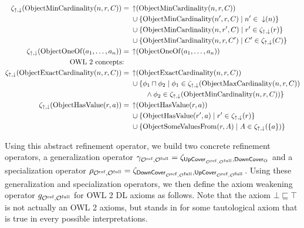 {\begin{align*}
    \zeta_{\mathop{\uparrow}, \mathop{\downarrow}}(\mathrm{ObjectMinCardinality}(n, r, C)) ={} & \mathop{\uparrow} (\mathrm{ObjectMinCardinality}(n, r, C)) \\& \cup \{\mathrm{ObjectMinCardinality}(n', r, C) \mid n' \in \; \mathop{\downarrow} (n)\} \\& \cup \{\mathrm{ObjectMinCardinality}(n, r', C) \mid r' \in \zeta_{\mathop{\uparrow}, \mathop{\downarrow}}(r)\} \\& \cup \{\mathrm{ObjectMinCardinality}(n, r, C') \mid C' \in \zeta_{\mathop{\uparrow}, \mathop{\downarrow}} (C)\} \\
    \zeta_{\mathop{\uparrow}, \mathop{\downarrow}}(\mathrm{ObjectOneOf}(a_1, \dots, a_n)) ={} & \mathop{\uparrow} (\mathrm{ObjectOneOf}(a_1, \dots, a_n)) \\
    \text{OWL 2 concepts:} \quad & \\
    \zeta_{\mathop{\uparrow}, \mathop{\downarrow}}(\mathrm{ObjectExactCardinality}(n, r, C)) ={} & \mathop{\uparrow} (\mathrm{ObjectExactCardinality}(n, r, C)) \\& \cup \{ \phi_1 \sqcap \phi_2   \mid \phi_1 \in \zeta_{\mathop{\uparrow}, \mathop{\downarrow}} (\mathrm{ObjectMaxCardinality}(n, r, C)) \\ \;& \qquad \land \phi_2 \in \zeta_{\mathop{\uparrow}, \mathop{\downarrow}} (\mathrm{ObjectMinCardinality}(n, r, C)) \} \\
    \zeta_{\mathop{\uparrow}, \mathop{\downarrow}}(\mathrm{ObjectHasValue}(r, a)) ={} & \mathop{\uparrow} (\mathrm{ObjectHasValue}(r, a)) \\&  \cup \{\mathrm{ObjectHasValue}(r', a) \mid r' \in \zeta_{\mathop{\uparrow}, \mathop{\downarrow}} (r)\} \\&  \cup \{\mathrm{ObjectSomeValuesFrom}(r, A) \mid A \in \zeta_{\mathop{\uparrow}, \mathop{\downarrow}}  (\{a\})\}
\end{align*}
}

Using this abstract refinement operator, we build two concrete refinement operators, a generalization operator $\gamma_{{\mathcal{O}^\textnormal{ref}},{\mathcal{O}^\textnormal{full}}} = \zeta_{{\mathsf{UpCover}}_{{\mathcal{O}^\textnormal{ref}},{\mathcal{O}^\textnormal{full}}}, {\mathsf{DownCover}}_\mathrm{O}}$ and a specialization operator $\rho_{{\mathcal{O}^\textnormal{ref}},{\mathcal{O}^\textnormal{full}}} = \zeta_{{\mathsf{DownCover}}_{{\mathcal{O}^\textnormal{ref}},{\mathcal{O}^\textnormal{full}}}, {\mathsf{UpCover}}_{{\mathcal{O}^\textnormal{ref}},{\mathcal{O}^\textnormal{full}}}}$. Using these generalization and specialization operators, we then define the axiom weakening operator $g_{{\mathcal{O}^\textnormal{ref}},{\mathcal{O}^\textnormal{full}}}$ for OWL 2 DL axioms as follows. Note that the axiom $\bot \sqsubseteq \top$ is not actually an OWL 2 axioms, but stands in for some tautological axiom that is true in every possible interpretations.

